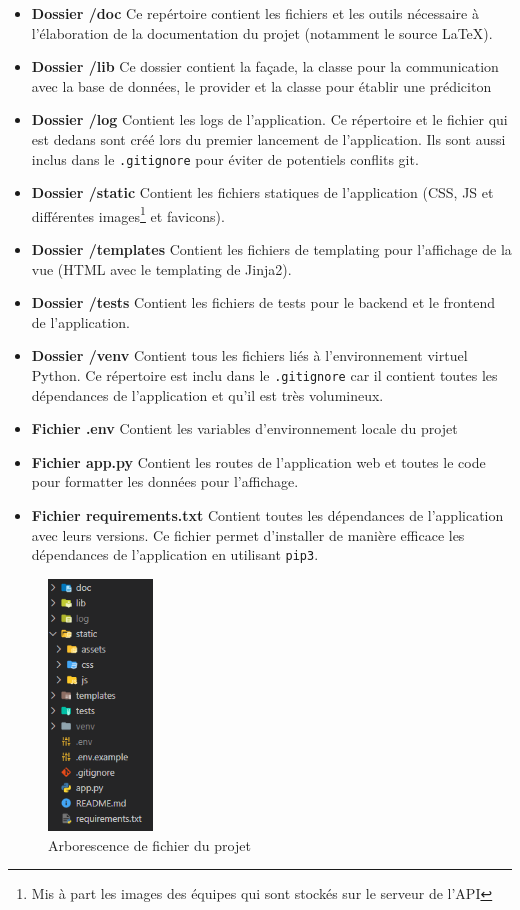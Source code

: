\documentclass[a4paper,14pt]{extarticle}
\begin{document}
{\begin{itemize}
    \item \textbf{Dossier /doc} Ce repértoire contient les fichiers et les outils nécessaire à l'élaboration de la documentation du projet (notamment le source \LaTeX{}).
    \item \textbf{Dossier /lib} Ce dossier contient la façade, la classe pour la communication avec la base de données, le provider et la classe pour établir une prédiciton
    \item \textbf{Dossier /log} Contient les logs de l'application. Ce répertoire et le fichier qui est dedans sont créé lors du premier lancement de l'application. Ils sont aussi inclus dans le \texttt{.gitignore} pour éviter de potentiels conflits git.
    \item \textbf{Dossier /static} Contient les fichiers statiques de l'application (CSS, JS et différentes images\footnote{Mis à part les images des équipes qui sont stockés sur le serveur de l'API} et favicons).
    \item \textbf{Dossier /templates} Contient les fichiers de templating pour l'affichage de la vue (HTML avec le templating de Jinja2).
    \item \textbf{Dossier /tests} Contient les fichiers de tests pour le backend et le frontend de l'application.
    \item \textbf{Dossier /venv} Contient tous les fichiers liés à l'environnement virtuel Python. Ce répertoire est inclu dans le \texttt{.gitignore} car il contient toutes les dépendances de l'application et qu'il est très volumineux.
    \item \textbf{Fichier .env} Contient les variables d'environnement locale du projet
    \item \textbf{Fichier app.py} Contient les routes de l'application web et toutes le code pour formatter les données pour l'affichage.
    \item \textbf{Fichier requirements.txt} Contient toutes les dépendances de l'application avec leurs versions. Ce fichier permet d'installer de manière efficace les dépendances de l'application en utilisant \texttt{pip3}.
\end{itemize}

\begin{figure}[htp]
    \centering
    \includegraphics[height=18em]{../img/arborescenceFichier.png}
    \caption{Arborescence de fichier du projet}
    \label{fig:arborescenceFichier}
\end{figure}

}
\end{document}
